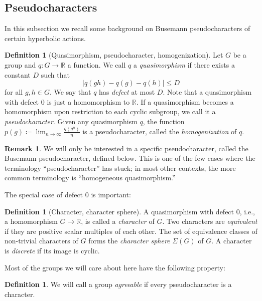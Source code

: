 \documentclass[reqno,12pt]{amsart}\setcounter{tocdepth}{1}
\theoremstyle{definition}
\newtheorem{definition}[theorem]{Definition}
\newtheorem{remark}[theorem]{Remark}
\newcommand{\R}{\mathbb{R}}
\numberwithin{equation}{section}
\begin{document}
\subsection{Pseudocharacters}\label{ssec:pseudochars}

In this subsection we recall some background on Busemann pseudocharacters of certain hyperbolic actions.

\begin{definition}[Quasimorphism, pseudocharacter, homogenization]
Let $G$ be a group and $q\colon G\to\R$ a function. We call $q$ a \emph{quasimorphism} if there exists a constant $D$ such that
\[
|q(gh)-q(g)-q(h)|\le D
\]
for all $g,h\in G$. We say that $q$ has \emph{defect} at most $D$. Note that a quasimorphism with defect $0$ is just a homomorphism to $\R$. If a quasimorphism becomes a homomorphism upon restriction to each cyclic subgroup, we call it a \emph{pseudocharacter}. Given any quasimorphism $q$, the function $p(g)\coloneqq \displaystyle \lim_{n\to\infty}\frac{q(g^n)}{n}$ is a pseudocharacter, called the \emph{homogenization} of $q$.
\end{definition}

\begin{remark}
We will only be interested in a specific pseudocharacter, called the Busemann pseudocharacter, defined below. This is one of the few cases where the terminology ``pseudocharacter'' has stuck; in most other contexts, the more common terminology is ``homogeneous quasimorphism.''
\end{remark}

The special case of defect $0$ is important:

\begin{definition}[Character, character sphere]
A quasimorphism with defect $0$, i.e., a homomorphism $G \to \R$, is called a \emph{character} of $G$. Two characters are \emph{equivalent} if they are positive scalar multiples of each other. The set of equivalence classes of non-trivial characters of $G$ forms the \emph{character sphere} $\Sigma(G)$ of $G$. A character is \emph{discrete} if its image is cyclic.
\end{definition}

Most of the groups we will care about here have the following property:

\begin{definition}%
We will call a group \emph{agreeable} if every pseudocharacter is a character.
\end{definition}
\end{document}
